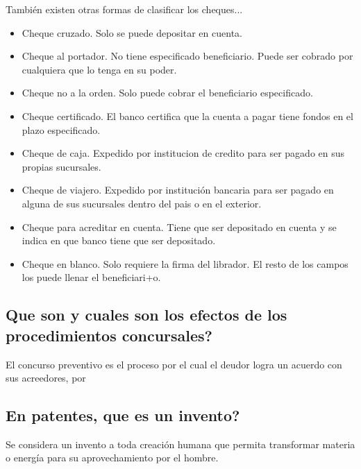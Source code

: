 \documentclass{article}
\begin{document}
También existen otras formas de clasificar los cheques...
\begin{itemize}
	\item Cheque cruzado. Solo se puede depositar en cuenta.
	\item Cheque al portador. No tiene especificado beneficiario. Puede ser cobrado por cualquiera que lo tenga en su poder.
	\item Cheque no a la orden. Solo puede cobrar el beneficiario especificado.
	\item  Cheque certificado. El banco certifica que la cuenta a pagar tiene fondos en el plazo especificado.
	\item Cheque de caja. Expedido por institucion de credito para ser pagado en sus propias sucursales.
	\item Cheque de viajero. Expedido por institución bancaria para ser pagado en alguna de sus sucursales dentro del pais o en el exterior.
	\item Cheque para acreditar en cuenta. Tiene que ser depositado en cuenta y se indica en que banco tiene que ser depositado.
	\item Cheque en blanco. Solo requiere la firma del librador. El resto de los campos los puede llenar el beneficiari+o.
\end{itemize}
\subsection{Que son y cuales son los efectos de los procedimientos concursales?}
El concurso preventivo es el proceso por el cual el deudor logra un acuerdo con sus acreedores, por 

\subsection{En patentes, que es un invento?}
Se considera un invento a toda creación humana que permita transformar materia o energía para su aprovechamiento por el hombre.
\end{document}
